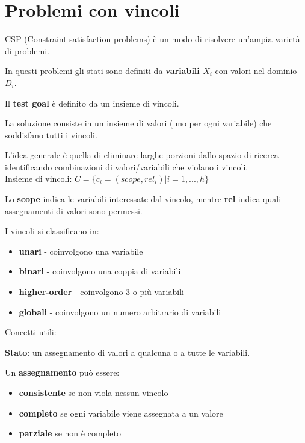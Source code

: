 \newpage

\section{Problemi con vincoli}

CSP (Constraint satisfaction problems) è un modo di risolvere un'ampia
varietà di problemi.

In questi problemi gli stati sono definiti da \textbf{variabili $X_i$} con
valori nel dominio $D_i$.

Il \textbf{test goal} è definito da un insieme di vincoli.

La {soluzione} consiste in un insieme di valori (uno per ogni variabile) che
soddisfano tutti i vincoli.

L'idea generale è quella di eliminare larghe porzioni dallo spazio di ricerca
identificando combinazioni di valori/variabili che violano i vincoli.\\

Insieme di vincoli: $C = \{ c_i = (scope,rel_i) | i=1,...,h\}$

Lo \textbf{scope} indica le variabili interessate dal vincolo, mentre
\textbf{rel} indica quali assegnamenti di valori sono permessi.

I vincoli si classificano in:

\begin{itemize}
 \item \textbf{unari} - coinvolgono una variabile
 \item \textbf{binari} - coinvolgono una coppia di variabili
 \item \textbf{higher-order} - coinvolgono 3 o più variabili
 \item \textbf{globali} - coinvolgono un numero arbitrario di variabili
\end{itemize}

Concetti utili:

\textbf{Stato}: un assegnamento di valori a qualcuna o a tutte le variabili.

Un \textbf{assegnamento} può essere:

\begin{itemize}
 \item \textbf{consistente} se non viola nessun vincolo
 \item \textbf{completo} se ogni variabile viene assegnata a un valore
 \item \textbf{parziale} se non è completo
\end{itemize}

